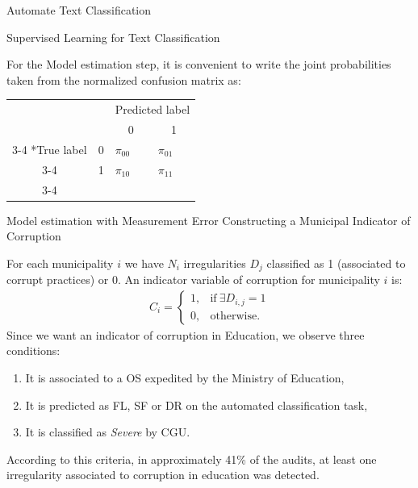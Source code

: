 \documentclass[handout,t,usenames,dvipsnames]{beamer}
\begin{document}
\begin{frame}{Automate Text Classification}

{\color{emap-azul-escuro}\large Supervised Learning for Text Classification}
\vspace{0.5em}
\justifying

\small
For the Model estimation step, it is convenient to write the joint probabilities taken from the normalized confusion matrix as:

\vspace{1em}
  \begin{table}[h!]
  \label{eq:conf_matrix}
    \setlength{\extrarowheight}{2pt}
    \centering
    \begin{tabular}{c c|p{1cm}|p{1cm}|}
      & \multicolumn{1}{c}{} & \multicolumn{2}{c}{Predicted label}\\
      & \multicolumn{1}{c}{} & \multicolumn{1}{c}{0}  & \multicolumn{1}{c}{1} \\\cline{3-4}
      \multirow{2}*{True label}  & 0 & $\pi_{00}$  & $\pi_{01}$ \\\cline{3-4}
      & 1 & $\pi_{10}$ & $\pi_{11}$\\\cline{3-4}
    \end{tabular}
  \end{table}
\end{frame}

\begin{frame}{Model estimation with Measurement Error}
\justifying
{\color{emap-azul-escuro}\large Constructing a Municipal Indicator of Corruption}
\vspace{0.5em}
\small

For each municipality $i$ we have $N_i$ irregularities $D_j$ classified as 1 (associated to corrupt practices) or 0. An indicator variable of corruption for municipality $i$ is:
  \begin{align*}
    C_i=
    \begin{cases}
      1, & \text{if}\ \exists D_{i,j}=1 \\
      0, & \text{otherwise}.
    \end{cases}
  \end{align*}
Since we want an indicator of corruption in Education, we observe three conditions:
\begin{enumerate}
    \item \small It is associated to a OS expedited by the Ministry of Education,
    \item \small It is predicted as FL, SF or DR on the automated classification task,
    \item \small It is classified as \textit{Severe} by CGU.
\end{enumerate}
According to this criteria, in approximately 41\% of the audits, at least one irregularity associated to corruption in education was detected.
\end{frame}
\end{document}
